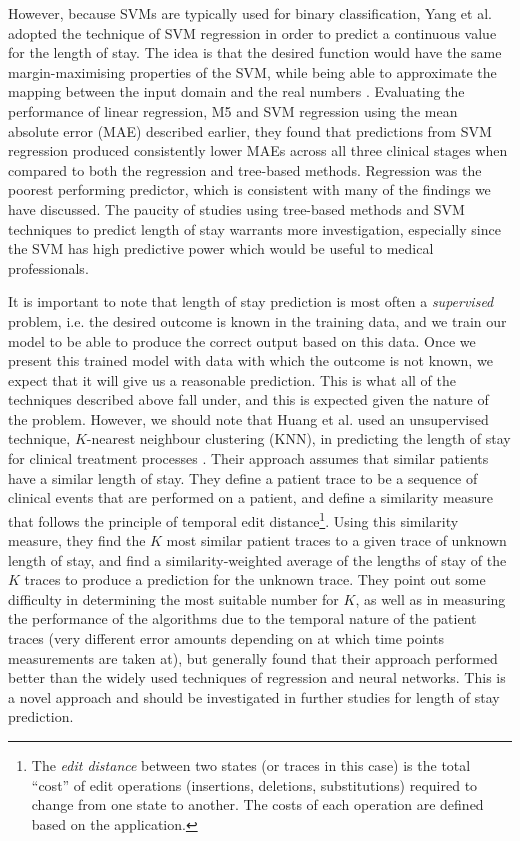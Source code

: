 However, because SVMs are typically
used for binary classification, Yang et al. adopted the technique of SVM
regression in order to predict a continuous value for the length of stay. The
idea is that the desired function would have the same margin-maximising
properties of the SVM, while being able to approximate the mapping between the
input domain and the real numbers \citep{Yang2010}. Evaluating the performance
of linear regression, M5 and SVM regression using the mean absolute error
(MAE) described earlier, they found that predictions from SVM regression
produced consistently lower MAEs across all three clinical stages when compared
to both the regression and tree-based methods. Regression was the poorest
performing predictor, which is consistent with many of the findings we have
discussed. The paucity of studies using tree-based methods and SVM techniques
to predict length of stay warrants more investigation, especially since the
SVM has high predictive power which would be useful to medical professionals.

It is important to note that length of stay prediction is most often a
\textit{supervised} problem, i.e. the desired outcome is known in the training
data, and we train our model to be able to produce the correct output based on
this data. Once we present this trained model with data with which the outcome
is not known, we expect that it will give us a reasonable prediction. This is
what all of the techniques described above fall under, and this is expected
given the nature of the problem. However, we should note that Huang et al. 
used an unsupervised technique, $K$-nearest neighbour clustering (KNN), in 
predicting the length of stay for clinical
treatment processes \citep{Huang2013}. Their approach assumes that similar
patients have a similar length of
stay. They define a patient trace to be a sequence of clinical events that are
performed on a patient, and define a similarity measure that follows the
principle of temporal edit distance\footnote{The \textit{edit distance}
between two states (or traces in this case) is the total ``cost'' of edit
operations (insertions, deletions, substitutions) required to change from
one state to another. The costs of each operation are defined based on the
application.}. Using this similarity measure, they find the $K$ most similar
patient traces to a given trace of unknown length of stay,
and find a similarity-weighted average of the lengths of stay
of the $K$ traces to produce a prediction for the unknown trace. They point
out some difficulty in determining the most suitable number for $K$, as well
as in measuring the performance of the algorithms due to the temporal nature
of the patient traces (very different error amounts depending on at which
time points measurements are taken at), but generally found that their
approach performed better than the widely used techniques of regression and
neural networks. This is a novel approach and should be investigated in further
studies for length of stay prediction.

